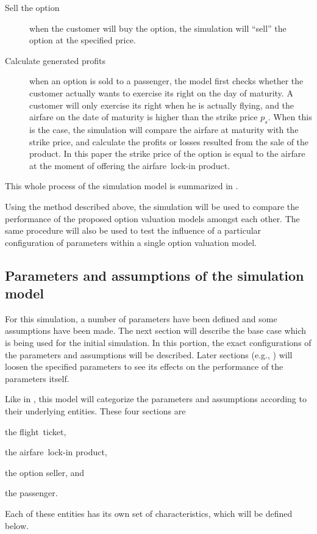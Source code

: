 \begin{description}
\item[Sell the option] when the customer will buy the option, the simulation will ``sell'' the option at the specified price.
\item[Calculate generated profits] when an option is sold to a passenger, the model first checks whether the customer actually wants to exercise its right on the day of maturity. A customer will only exercise its right when he is actually flying, and the airfare on the date of maturity is higher than the strike price $p_s$. When this is the case, the simulation will compare the airfare at maturity with the strike price, and calculate the profits or losses resulted from the sale of the product. In this paper the strike price of the option is equal to the airfare at the moment of offering the airfare~lock-in product.
\end{description}

\noindent
This whole process of the simulation model is summarized in .


Using the method described above, the simulation will be used to compare the performance of the proposed option valuation models amongst each other. The same procedure will also be used to test the influence of a particular configuration of parameters within a single option valuation model.



\subsection{Parameters and assumptions of the simulation model}
For this simulation, a number of parameters have been defined and some assumptions have been made. The next section will describe the base case which is being used for the initial simulation. In this portion, the exact configurations of the parameters and assumptions will be described. Later sections (e.g., ) will loosen the specified parameters to see its effects on the performance of the parameters itself.

Like in , this model will categorize the parameters and assumptions according to their underlying entities. These four sections are \begin{inparaenum}
\item the flight~ticket,
\item the airfare~lock-in product,
\item the option seller, and
\item the passenger.
\end{inparaenum} Each of these entities has its own set of characteristics, which will be defined below.


